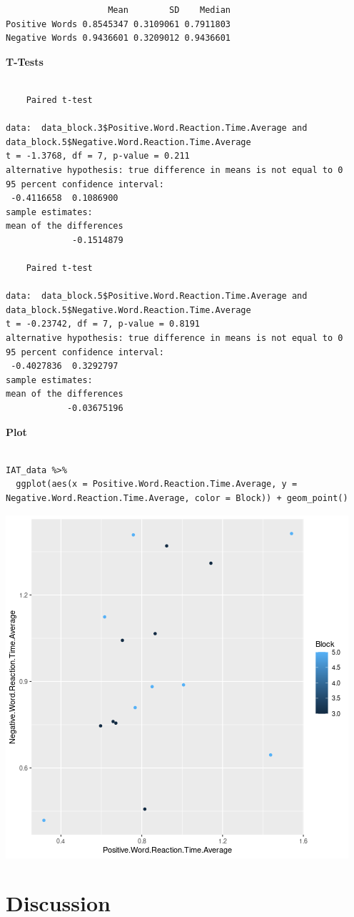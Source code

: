 \documentclass[11pt]{article}
\begin{document}
\begin{verbatim}
                    Mean        SD    Median
Positive Words 0.8545347 0.3109061 0.7911803
Negative Words 0.9436601 0.3209012 0.9436601
\end{verbatim}





\textbf{T-Tests}
\begin{verbatim}

	Paired t-test

data:  data_block.3$Positive.Word.Reaction.Time.Average and data_block.5$Negative.Word.Reaction.Time.Average
t = -1.3768, df = 7, p-value = 0.211
alternative hypothesis: true difference in means is not equal to 0
95 percent confidence interval:
 -0.4116658  0.1086900
sample estimates:
mean of the differences 
             -0.1514879

	Paired t-test

data:  data_block.5$Positive.Word.Reaction.Time.Average and data_block.5$Negative.Word.Reaction.Time.Average
t = -0.23742, df = 7, p-value = 0.8191
alternative hypothesis: true difference in means is not equal to 0
95 percent confidence interval:
 -0.4027836  0.3292797
sample estimates:
mean of the differences 
            -0.03675196
\end{verbatim}

\textbf{Plot}
\begin{verbatim}

IAT_data %>%
  ggplot(aes(x = Positive.Word.Reaction.Time.Average, y = Negative.Word.Reaction.Time.Average, color = Block)) + geom_point()

\end{verbatim}

\begin{center}
\includegraphics[width=.9\linewidth]{plot.png}
\end{center}

\section{Discussion}
\label{sec:org05d4142}




\end{document}
